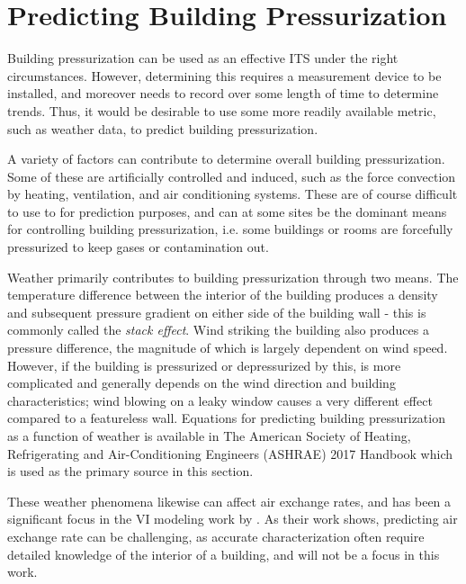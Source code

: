 \section{Predicting Building Pressurization}

Building pressurization can be used as an effective ITS under the right circumstances.
However, determining this requires a measurement device to be installed, and moreover needs to record over some length of time to determine trends.
Thus, it would be desirable to use some more readily available metric, such as weather data, to predict building pressurization.\par

A variety of factors can contribute to determine overall building pressurization.
Some of these are artificially controlled and induced, such as the force convection by heating, ventilation, and air conditioning systems.
These are of course difficult to use to for prediction purposes, and can at some sites be the dominant means for controlling building pressurization, i.e. some buildings or rooms are forcefully pressurized to keep gases or contamination out.\par

Weather primarily contributes to building pressurization through two means.
The temperature difference between the interior of the building produces a density and subsequent pressure gradient on either side of the building wall - this is commonly called the \textit{stack effect}.
Wind striking the building also produces a pressure difference, the magnitude of which is largely dependent on wind speed.
However, if the building is pressurized or depressurized by this, is more complicated and generally depends on the wind direction and building characteristics; wind blowing on a leaky window causes a very different effect compared to a featureless wall.
Equations for predicting building pressurization as a function of weather is available in The American Society of Heating, Refrigerating and Air-Conditioning Engineers (ASHRAE) 2017 Handbook\cite{american_society_of_heating_2017_nodate} which is used as the primary source in this section.\par

These weather phenomena likewise can affect air exchange rates, and has been a significant focus in the VI modeling work by \citeauthor{shirazi_three-dimensional_2017}\cite{shirazi_three-dimensional_2017}.
As their work shows, predicting air exchange rate can be challenging, as accurate characterization often require detailed knowledge of the interior of a building, and will not be a focus in this work.\par

